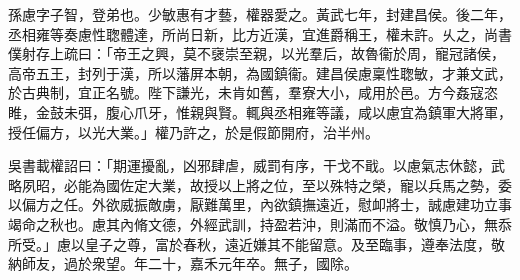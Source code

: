 
\begin{pinyinscope}
孫慮字子智，登弟也。少敏惠有才藝，權器愛之。黃武七年，封建昌侯。後二年，丞相雍等奏慮性聦體達，所尚日新，比方近漢，宜進爵稱王，權未許。乆之，尚書僕射存上疏曰：「帝王之興，莫不襃崇至親，以光羣后，故魯衞於周，寵冠諸侯，高帝五王，封列于漢，所以藩屏本朝，為國鎮衞。建昌侯慮稟性聦敏，才兼文武，於古典制，宜正名號。陛下謙光，未肯如舊，羣寮大小，咸用於邑。方今姦寇恣睢，金鼓未弭，腹心爪牙，惟親與賢。輒與丞相雍等議，咸以慮宜為鎮軍大將軍，授任偏方，以光大業。」權乃許之，於是假節開府，治半州。

吳書載權詔曰：「期運擾亂，凶邪肆虐，威罰有序，干戈不戢。以慮氣志休懿，武略夙昭，必能為國佐定大業，故授以上將之位，至以殊特之榮，寵以兵馬之勢，委以偏方之任。外欲威振敵虜，厭難萬里，內欲鎮撫遠近，慰卹將士，誠慮建功立事竭命之秋也。慮其內脩文德，外經武訓，持盈若沖，則滿而不溢。敬慎乃心，無忝所受。」慮以皇子之尊，富於春秋，遠近嫌其不能留意。及至臨事，遵奉法度，敬納師友，過於衆望。年二十，嘉禾元年卒。無子，國除。


\end{pinyinscope}
